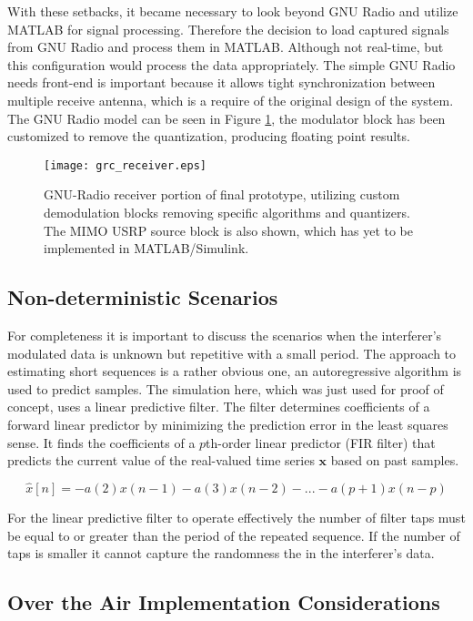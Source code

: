 With these setbacks, it became necessary to look beyond GNU Radio and utilize MATLAB for signal processing.  Therefore the decision to load captured signals from GNU Radio and process them in MATLAB.  Although not real-time, but this configuration would process the data appropriately.  The simple GNU Radio needs front-end is important because it allows tight synchronization between multiple receive antenna, which is a require of the original design of the system.  The GNU Radio model can be seen in Figure \ref{ref:grc_receiver}, the modulator block has been customized to remove the quantization, producing floating point results.\\

\begin{figure}[!ht]
\centering
\texttt{[image: grc\_receiver.eps]}
\caption{GNU-Radio receiver portion of final prototype, utilizing custom demodulation blocks removing specific algorithms and quantizers.  The MIMO USRP source block is also shown, which has yet to be implemented in MATLAB/Simulink.}
\label{ref:grc_receiver}
\end{figure}

\subsection{Non-deterministic Scenarios}

For completeness it is important to discuss the scenarios when the interferer's modulated data is unknown but repetitive with a small period.  The approach to estimating short sequences is a rather obvious one, an autoregressive algorithm is used to predict samples.  The simulation here, which was just used for proof of concept, uses a linear predictive filter.  The filter determines coefficients of a forward linear predictor by minimizing the prediction error in the least squares sense\cite{lpcfilter}.  It finds the coefficients of a \(p\)th-order linear predictor (FIR filter) that predicts the current value of the real-valued time series \(\textbf{x}\) based on past samples.

\[ \hat{x}[n]=-a(2)x(n-1)-a(3)x(n-2)-...-a(p+1)x(n-p)\]

For the linear predictive filter to operate effectively the number of filter taps must be equal to or greater than the period of the repeated sequence.  If the number of taps is smaller it cannot capture the randomness the in the interferer's data.\\

\subsection{Over the Air Implementation Considerations}

